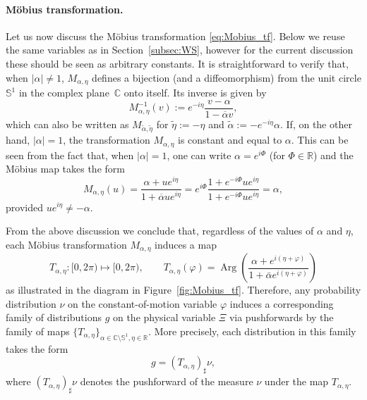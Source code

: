 \documentclass[10pt]{article}
\theoremstyle{definition}
\theoremstyle{definition}
\numberwithin{equation}{section}
\newcommand{\R}{\mathbb{R}}
\newcommand{\BBS}{\mathbb{S}}
\newcommand{\BBC}{\mathbb{C}}
\newcommand{\C}{\mathbb{C}}
\renewcommand{\S}{\mathbb{S}}
\newcommand{\alphaBar}{\overline{\alpha}}
\newcommand{\Arg}{\operatorname{Arg}}
\begin{document}
\paragraph{Möbius transformation.}
Let us now discuss the Möbius transformation \eqref{eq:Mobius_tf}.  Below we reuse the same variables as in Section~\ref{subsec:WS}, however for the current discussion these should be seen as arbitrary constants. It is straightforward to verify that, when $|\alpha| \not =1$, $M_{\alpha, \eta}$ defines a bijection (and a diffeomorphism) from the unit circle $\BBS^1$ in the complex plane~$\BBC$ onto itself.
Its inverse is given by
\begin{equation}\label{eq:inverse_M}
M_{\alpha, \eta}^{-1} (v) := e^{-i\eta} \frac{v - \alpha}{1 - \alphaBar v},
\end{equation}
which can also be written as $M_{\tilde \alpha, \tilde \eta}$ for $\tilde \eta := -\eta$ and $\tilde{\alpha} := - e^{-i\eta} \alpha$. If, on the other hand, $|\alpha|=1$, the transformation $M_{\alpha, \eta}$ is constant and equal to $\alpha$. This can be seen from the fact that, when $|\alpha| = 1$, one can write $\alpha = e^{i\Phi}$ (for $\Phi \in \R$) and the Möbius map takes the form
\begin{equation}
    M_{\alpha, \eta} (u) = \frac{\alpha + u e^{i\eta}}{1 + \alphaBar u e^{i\eta}} = e^{i\Phi} \frac{1 + e^{-i\Phi} u e^{i\eta}}{1 + e^{-i\Phi} u e^{i\eta}} = \alpha,
    \label{eqn:MobiusUnitNormAlpha}
\end{equation}
provided $ue^{i\eta} \neq -\alpha$.

From the above discussion we conclude that, regardless of the values of $\alpha$ and $\eta$, each Möbius transformation $M_{\alpha, \eta}$ induces a map 
\begin{equation}\label{eq:map_T}
T_{\alpha, \eta} : [0, 2\pi) \mapsto [0, 2\pi),\qquad T_{\alpha,\eta}(\varphi) = \Arg\!\left(
\frac{\alpha+e^{i(\eta+\varphi)}}{1+\bar\alpha e^{i(\eta+\varphi)}}
\right)
\end{equation}
as illustrated in the diagram in Figure~\ref{fig:Mobius_tf}.
Therefore, any probability distribution $\nu$ on the constant-of-motion variable $\varphi$ induces a corresponding family of distributions $g$ on the physical variable $\Xi$ via pushforwards by the family of maps $\{ T_{\alpha, \eta}\}_{\alpha \in \C \setminus \S^1 , \eta \in \R}$. More precisely, each distribution in this family takes the form
\begin{equation}\label{eq:g_and_nu}
    g = (T_{\alpha, \eta})_{\sharp} \nu,
\end{equation} 
where $(T_{\alpha, \eta})_{\sharp} \nu$ denotes the pushforward of the measure $\nu$ under the map $T_{\alpha, \eta}$. 
\end{document}
